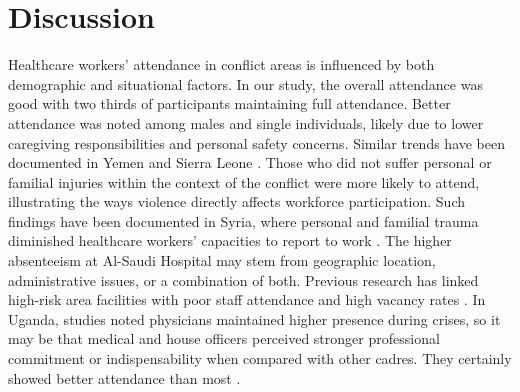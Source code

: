 \documentclass[12pt]{article}
\begin{document}
\section*{ Discussion}


Healthcare workers’ attendance in conflict areas is influenced by both demographic and situational factors. In our study, the overall attendance was good with two thirds of participants maintaining full attendance. Better attendance was noted among males and single individuals, likely due to lower caregiving responsibilities and personal safety concerns. Similar trends have been documented in Yemen and Sierra Leone \cite{khader2015factors, wurie2016retention}.
Those who did not suffer personal or familial injuries within the context of the conflict were more likely to attend, illustrating the ways violence directly affects workforce participation. Such findings have been documented in Syria, where personal and familial trauma diminished healthcare workers’ capacities to report to work \cite{fouad2017health, witter2017providing}.
The higher absenteeism at Al-Saudi Hospital may stem from geographic location, administrative issues, or a combination of both. Previous research has linked high-risk area facilities with poor staff attendance and high vacancy rates \cite{pavignani2009analysing}.
In Uganda, studies noted physicians maintained higher presence during crises, so it may be that medical and house officers perceived stronger professional commitment or indispensability when compared with other cadres. They certainly showed better attendance than most \cite{ssengooba2015health}. 
\end{document}
